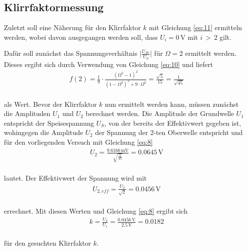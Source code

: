 \subsection{Klirrfaktormessung}

Zuletzt soll eine Näherung für den Klirrfaktor $k$ mit Gleichung \ref{eq:11} ermitteln werden, wobei 
davon ausgegangen werden soll, dass $U_{i} = 0\, \si{\volt}$ mit $i\,>\,2$ gilt.  

Dafür soll zunächst das Spannungsverhältnis $\lvert{\frac{U_{Br}}{U_S}}\rvert$ für $\Omega = 2$ ermittelt werden. Dieses ergibt sich 
durch Verwendung von Gleichung \ref{eq:10} und liefert 
\begin{align}
f(2) =  \frac{1}{9} \cdot \frac{(\Omega^2 - 1)^2}{(1 - \Omega^2)^2 + 9 \cdot \Omega^2}  = \frac{\sqrt{5}}{15} = \frac{1}{\sqrt{45}} \nonumber
\end{align}
\\
als Wert. Bevor der Klirrfaktor $k$ nun ermittelt werden kann, müssen zunächst die Amplituden $U_{1}$ und $U_{2}$ berechnet werden.
Die Amplitude der Grundwelle $U_{1}$ entspricht der Speisespannung $U_{S}$, von der bereits der Effektivwert gegeben ist, wohingegen die Amplitude $U_{2}$ der Spannung der
2-ten Oberwelle entspricht und für den vorliegenden Versuch mit Gleichung \ref{eq:8}
\begin{align}
U_{2} = \frac{9.6166\, \si{\milli\volt}}{\sqrt{\frac{1}{45}}} = 0.0645\, \si{\volt} \nonumber
\end{align}
\\
lautet. Der Effektivwert der Spannung wird mit 
\begin{align}
U_{2,eff} = \frac{U_{2}}{\sqrt{2}} = 0.0456\, \si{\volt} \nonumber
\end{align}
\\
errechnet.
Mit diesen Werten und Gleichung \ref{eq:8} ergibt sich 
\begin{align}
k = \frac{U_{2}}{U_{1}} = \frac{0.0456\, \si{\volt}}{2.5\, \si{\volt}} = 0.0182 \nonumber
\end{align}
\\ 
für den gesuchten Klirrfaktor $k$.